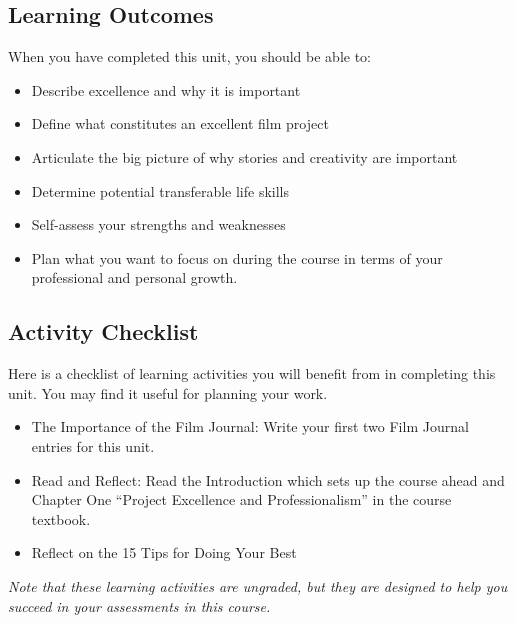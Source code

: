 \documentclass[
]{book}
\providecommand{\tightlist}{%
  \setlength{\itemsep}{0pt}\setlength{\parskip}{0pt}}
\begin{document}
\hypertarget{learning-outcomes}{%
\subsection*{Learning Outcomes}\label{learning-outcomes}}

When you have completed this unit, you should be able to:

\begin{itemize}
\tightlist
\item
  Describe excellence and why it is important\\
\item
  Define what constitutes an excellent film project\\
\item
  Articulate the big picture of why stories and creativity are important\\
\item
  Determine potential transferable life skills\\
\item
  Self-assess your strengths and weaknesses\\
\item
  Plan what you want to focus on during the course in terms of your professional and personal growth.
\end{itemize}

\hypertarget{activity-checklist}{%
\subsection*{Activity Checklist}\label{activity-checklist}}

\begin{reflect}
Here is a checklist of learning activities you will benefit from in completing this unit. You may find it useful for planning your work.

\begin{itemize}
\tightlist
\item
  The Importance of the Film Journal: Write your first two Film Journal entries for this unit.
\item
  Read and Reflect: Read the Introduction which sets up the course ahead and Chapter One ``Project Excellence and Professionalism'' in the course textbook.
\item
  Reflect on the 15 Tips for Doing Your Best
\end{itemize}

\emph{Note that these learning activities are ungraded, but they are designed to help you succeed in your assessments in this course.}
\end{reflect}
\end{document}
